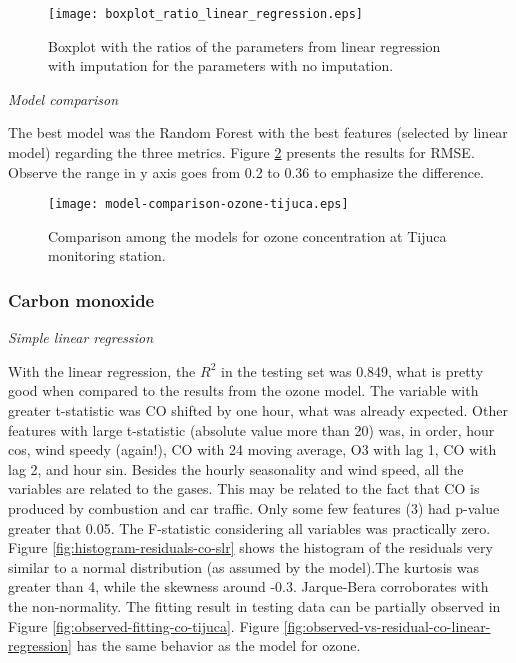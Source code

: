 \begin{figure}
    \centering
    \texttt{[image: boxplot\_ratio\_linear\_regression.eps]}
    \caption{Boxplot with the ratios of the parameters from linear regression
    with imputation for the parameters with no imputation.}
    \label{fig:boxplot-linear-regression}
\end{figure}

\vspace{2mm}

{\em Model comparison} 

\vspace{2mm}

The best model was the Random Forest with the best features (selected by linear model) regarding the three metrics. Figure
\ref{fig:model-comparison-ozone-tijuca} presents the results for RMSE. Observe
the range in y axis goes from 0.2 to 0.36 to emphasize the difference.

\begin{figure}
    \centering
    \texttt{[image: model-comparison-ozone-tijuca.eps]}
    \caption{Comparison among the models for ozone concentration at Tijuca monitoring station.}
    \label{fig:model-comparison-ozone-tijuca}
\end{figure}

\subsubsection{Carbon monoxide}

{\em Simple linear regression}

\vspace{2mm}

With the linear regression, the $R^2$ in the testing set was 0.849,
what is pretty good when compared to the results from the ozone model. The variable with greater t-statistic
was CO shifted by one hour, what was already expected. Other features with
large t-statistic (absolute value more than
20) was, in
order, hour cos, wind speedy (again!), CO with 24 moving average, O3 with lag
1, CO with lag
2, and hour sin. Besides the hourly seasonality and wind speed, all the
variables are related to the gases. This may be related to the fact that CO is
produced by combustion and car traffic. Only some few features (3) had p-value
greater that 0.05. The F-statistic considering all variables was practically zero. Figure \ref{fig:histogram-residuals-co-slr} shows
the histogram of the residuals very similar to a normal distribution (as
assumed by the model).The kurtosis was greater than 4, while the skewness around
-0.3. Jarque-Bera corroborates with the non-normality. The fitting result in testing data can be
partially observed in Figure \ref{fig:observed-fitting-co-tijuca}.  Figure
\ref{fig:observed-vs-residual-co-linear-regression} has the same behavior as
the model for ozone.  

